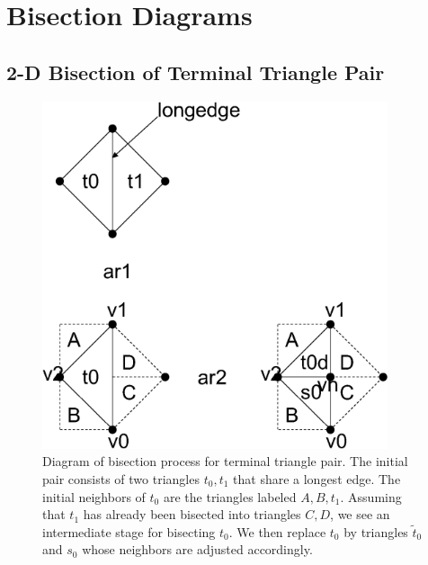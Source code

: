 
\section{Bisection Diagrams}

\subsection{2-D Bisection of Terminal Triangle Pair}

\begin{figure}
\begin{center}

  





\includegraphics[width=4.0in]{Bisect_Terminal_Triangle_Pair}
\caption{Diagram of bisection process for terminal triangle pair.  The initial pair consists of two triangles $t_0, t_1$ that share a longest edge.  The initial neighbors of $t_0$ are the triangles labeled $A, B, t_1$.  Assuming that $t_1$ has already been bisected into triangles $C, D$, we see an intermediate stage for bisecting $t_0$.  We then replace $t_0$ by triangles $\tilde{t}_0$ and $s_0$ whose neighbors are adjusted accordingly.} \label{fig:Bisect_Terminal_Pair_2D}
\end{center}
\end{figure}

